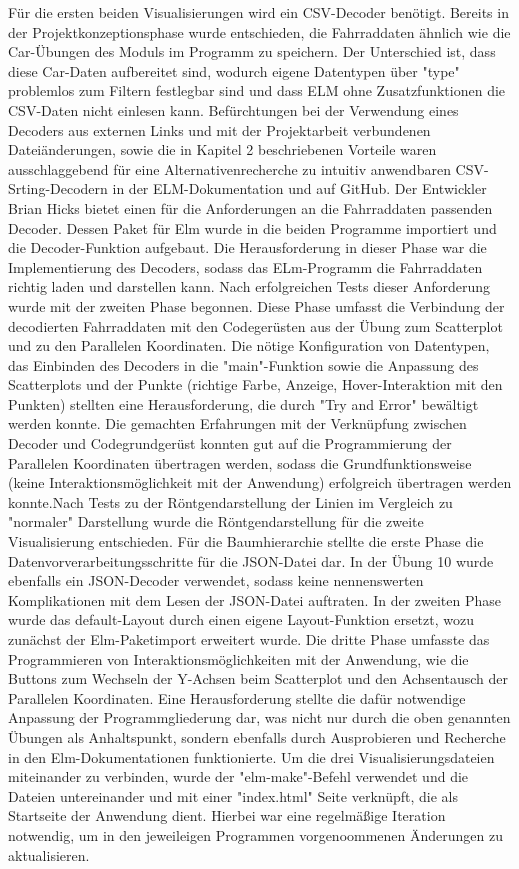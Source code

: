 \documentclass[usegeometry=true]{scrartcl}
\begin{document}
Für die ersten beiden Visualisierungen wird ein CSV-Decoder benötigt. Bereits in der Projektkonzeptionsphase wurde entschieden, die Fahrraddaten ähnlich wie die Car-Übungen des Moduls im Programm zu speichern. Der Unterschied ist, dass diese Car-Daten aufbereitet sind, wodurch eigene Datentypen über "type" problemlos zum Filtern festlegbar sind und dass ELM ohne Zusatzfunktionen die CSV-Daten nicht einlesen kann. Befürchtungen bei der Verwendung eines Decoders aus externen Links und mit der Projektarbeit verbundenen Dateiänderungen, sowie die in Kapitel 2 beschriebenen Vorteile waren ausschlaggebend für eine Alternativenrecherche zu intuitiv anwendbaren CSV-Srting-Decodern in der ELM-Dokumentation und auf GitHub. Der Entwickler Brian Hicks bietet einen für die Anforderungen an die Fahrraddaten passenden Decoder. Dessen Paket für Elm wurde in die beiden Programme importiert und die Decoder-Funktion aufgebaut. 
Die Herausforderung in dieser Phase war die Implementierung des Decoders, sodass das ELm-Programm die Fahrraddaten richtig laden und darstellen kann. Nach erfolgreichen Tests dieser Anforderung wurde mit der zweiten Phase begonnen.
Diese Phase umfasst die Verbindung der decodierten Fahrraddaten mit den Codegerüsten aus der Übung zum Scatterplot und zu den Parallelen Koordinaten. Die nötige Konfiguration von Datentypen, das Einbinden des Decoders in die "main"-Funktion sowie die Anpassung des Scatterplots und der Punkte (richtige Farbe, Anzeige, Hover-Interaktion mit den Punkten) stellten eine Herausforderung, die durch "Try and Error" bewältigt werden konnte. Die gemachten Erfahrungen mit der Verknüpfung zwischen Decoder und Codegrundgerüst konnten gut auf die Programmierung der Parallelen Koordinaten übertragen werden, sodass die Grundfunktionsweise (keine Interaktionsmöglichkeit mit der Anwendung) erfolgreich übertragen werden konnte.Nach Tests zu der Röntgendarstellung der Linien im Vergleich zu "normaler" Darstellung wurde die Röntgendarstellung für die zweite Visualisierung entschieden.
Für die Baumhierarchie stellte die erste Phase die Datenvorverarbeitungsschritte für die JSON-Datei dar. In der Übung 10 wurde ebenfalls ein JSON-Decoder verwendet, sodass keine nennenswerten Komplikationen mit dem Lesen der JSON-Datei auftraten. In der zweiten Phase wurde das default-Layout durch einen eigene Layout-Funktion ersetzt, wozu zunächst der Elm-Paketimport erweitert wurde.
Die dritte Phase umfasste das Programmieren von Interaktionsmöglichkeiten mit der Anwendung, wie die Buttons zum Wechseln der Y-Achsen beim Scatterplot und den Achsentausch der Parallelen Koordinaten. Eine Herausforderung stellte die dafür notwendige Anpassung der Programmgliederung dar, was nicht nur durch die oben genannten Übungen als Anhaltspunkt, sondern ebenfalls durch Ausprobieren und Recherche in den Elm-Dokumentationen funktionierte. 
Um die drei Visualisierungsdateien miteinander zu verbinden, wurde der "elm-make"-Befehl verwendet und die Dateien untereinander und mit einer "index.html" Seite verknüpft, die als Startseite der Anwendung dient. Hierbei war eine regelmäßige Iteration notwendig, um in den jeweileigen Programmen vorgenoommenen Änderungen zu aktualisieren. 
 
\end{document}

